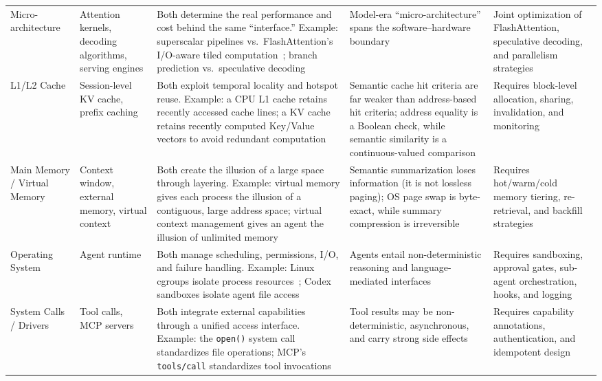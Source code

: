 \begin{longtable}{p{}p{}p{}p{}p{}}
Micro-architecture & Attention kernels, decoding algorithms, serving engines & Both determine the real performance and cost behind the same ``interface.'' Example: superscalar pipelines vs.\ FlashAttention's I/O-aware tiled computation~\cite{dao2022flashattention}; branch prediction vs.\ speculative decoding~\cite{leviathan2023speculative} & Model-era ``micro-architecture'' spans the software--hardware boundary & Joint optimization of FlashAttention, speculative decoding, and parallelism strategies \\[3pt]

L1/L2 Cache & Session-level KV cache, prefix caching & Both exploit temporal locality and hotspot reuse. Example: a CPU L1 cache retains recently accessed cache lines; a KV cache retains recently computed Key/Value vectors to avoid redundant computation~\cite{kwon2023pagedattention,vllm_prefix_2026} & Semantic cache hit criteria are far weaker than address-based hit criteria; address equality is a Boolean check, while semantic similarity is a continuous-valued comparison & Requires block-level allocation, sharing, invalidation, and monitoring \\[3pt]

Main Memory / Virtual Memory & Context window, external memory, virtual context & Both create the illusion of a large space through layering. Example: virtual memory gives each process the illusion of a contiguous, large address space; virtual context management gives an agent the illusion of unlimited memory~\cite{memgpt2023} & Semantic summarization loses information (it is not lossless paging); OS page swap is byte-exact, while summary compression is irreversible & Requires hot/warm/cold memory tiering, re-retrieval, and backfill strategies \\[3pt]

Operating System & Agent runtime & Both manage scheduling, permissions, I/O, and failure handling. Example: Linux cgroups isolate process resources~\cite{linux_cgroup_2026}; Codex sandboxes isolate agent file access~\cite{openai_codex_sandbox_2026} & Agents entail non-deterministic reasoning and language-mediated interfaces & Requires sandboxing, approval gates, sub-agent orchestration, hooks, and logging \\[3pt]

System Calls / Drivers & Tool calls, MCP servers & Both integrate external capabilities through a unified access interface. Example: the \texttt{open()} system call standardizes file operations; MCP's \texttt{tools/call} standardizes tool invocations~\cite{mcp_intro_2026} & Tool results may be non-deterministic, asynchronous, and carry strong side effects & Requires capability annotations, authentication, and idempotent design \\[3pt]


\end{longtable}
